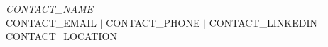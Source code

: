 \documentclass[letterpaper,11pt]{article}
\begin{document}
\begin{center}
    {\LARGE\itshape {{{CONTACT_NAME}}}} \\ \vspace{3pt}
    \small {{{CONTACT_EMAIL}}} $|$ {{{CONTACT_PHONE}}} $|$
    {{{CONTACT_LINKEDIN}}} $|$ {{{CONTACT_LOCATION}}}
\end{center}








\end{document}
